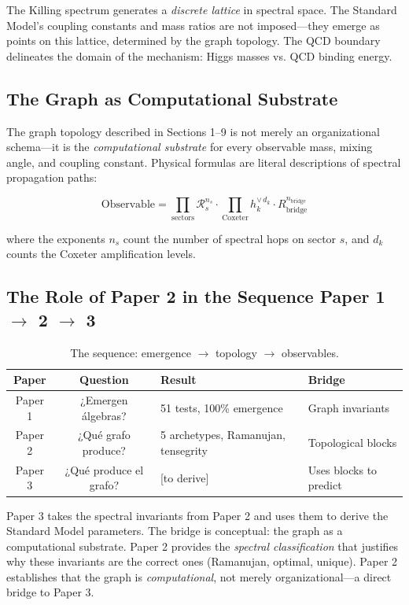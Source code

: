 The Killing spectrum generates a \emph{discrete lattice} in spectral space. The Standard Model's coupling constants and mass ratios are not imposed---they emerge as points on this lattice, determined by the graph topology. The QCD boundary delineates the domain of the mechanism: Higgs masses vs. QCD binding energy.

\subsection{The Graph as Computational Substrate}\label{sec:graph_computational}

The graph topology described in Sections 1--9 is not merely an organizational schema---it is the \emph{computational substrate} for every observable mass, mixing angle, and coupling constant. Physical formulas are literal descriptions of spectral propagation paths:

\begin{equation}
\text{Observable} = \prod_{\mathrm{sectors}} \mathcal{R}_s^{n_s} \cdot \prod_{\mathrm{Coxeter}} h_k^{\vee \, d_k} \cdot R_{\mathrm{bridge}}^{n_{\mathrm{bridge}}}
\end{equation}

where the exponents $n_s$ count the number of spectral hops on sector $s$, and $d_k$ counts the Coxeter amplification levels.

\subsection{The Role of Paper 2 in the Sequence Paper 1 $\to$ 2 $\to$ 3}\label{sec:paper_sequence}

\begin{table}[h]
\centering
\begin{tabular}{c c l l}
\hline\hline
Paper & Question & Result & Bridge \\
\hline
Paper 1 & ¿Emergen álgebras? & 51 tests, 100\% emergence & Graph invariants \\
Paper 2 & ¿Qué grafo produce? & 5 archetypes, Ramanujan, tensegrity & Topological blocks \\
Paper 3 & ¿Qué produce el grafo? & [to derive] & Uses blocks to predict \\
\hline\hline
\end{tabular}
\caption{The sequence: emergence $\to$ topology $\to$ observables.}
\end{table}

Paper 3 takes the spectral invariants from Paper 2 and uses them to derive the Standard Model parameters. The bridge is conceptual: the graph as a computational substrate. Paper 2 provides the \emph{spectral classification} that justifies why these invariants are the correct ones (Ramanujan, optimal, unique). Paper 2 establishes that the graph is \emph{computational}, not merely organizational---a direct bridge to Paper 3.
